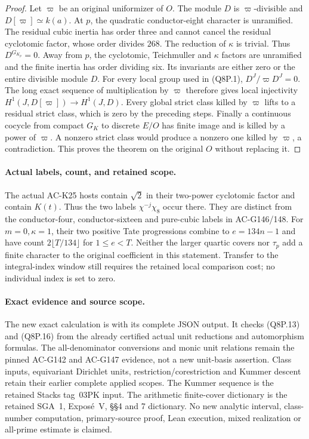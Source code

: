 \begin{proof}
Let $\varpi$ be an original uniformizer of $O$.
The module $D$ is $\varpi$-divisible and $D[\varpi]\simeq k(a)$.
At $p$, the quadratic conductor-eight character is unramified.
The residual cubic inertia has order three and cannot cancel
the residual cyclotomic factor, whose order divides $268$.
The reduction of $\kappa$ is trivial.
Thus $D^{G_{K_p}}=0$.
Away from $p$, the cyclotomic, Teichmuller and $\kappa$ factors
are unramified and the finite inertia has order dividing six.
Its invariants are either zero or the entire divisible module $D$.
For every local group used in (Q8P.1),
$D^J/\varpi D^J=0$.
The long exact sequence of multiplication by $\varpi$
therefore gives local injectivity
$H^1(J,D[\varpi])\to H^1(J,D)$.
Every global strict class killed by $\varpi$ lifts to a residual
strict class, which is zero by the preceding steps.
Finally a continuous cocycle from compact $G_K$ to discrete $E/O$
has finite image and is killed by a power of $\varpi$.
A nonzero strict class would produce a nonzero one killed by
$\varpi$, a contradiction.
This proves the theorem on the original $O$ without replacing it.
\end{proof}

\paragraph{Actual labels, count, and retained scope.}
The actual AC-K25 hosts contain $\sqrt2$ in their two-power
cyclotomic factor and contain $K(t)$.
Thus the two labels $\chi^{-j}\chi_8$ occur there.
They are distinct from the conductor-four, conductor-sixteen
and pure-cubic labels in AC-G146/148.
For $m=0,\kappa=1$, their two positive Tate progressions combine
to $e=134n-1$ and have count
$2\lfloor T/134\rfloor$ for $1\leq e<T$.
Neither the larger quartic covers nor $\tau_p$ add a finite
character to the original coefficient in this statement.
Transfer to the integral-index window still requires the
retained local comparison cost; no individual index is set to zero.

\paragraph{Exact evidence and source scope.}
The new exact calculation is
 with its complete JSON output.
It checks (Q8P.13) and (Q8P.16) from the already certified actual
unit reductions and automorphism formulas.
The all-denominator conversions and monic unit relations remain
the pinned AC-G142 and AC-G147 evidence, not a new unit-basis assertion.
Class inputs, equivariant Dirichlet units, restriction/corestriction
and Kummer descent retain their earlier complete applied scopes.
The Kummer sequence is the retained Stacks tag~03PK input.
The arithmetic finite-cover dictionary is the retained SGA~1,
Expos\'e~V, \S\S4 and 7 dictionary.
No new analytic interval, class-number computation, primary-source
proof, Lean execution, mixed realization or all-prime estimate is claimed.
